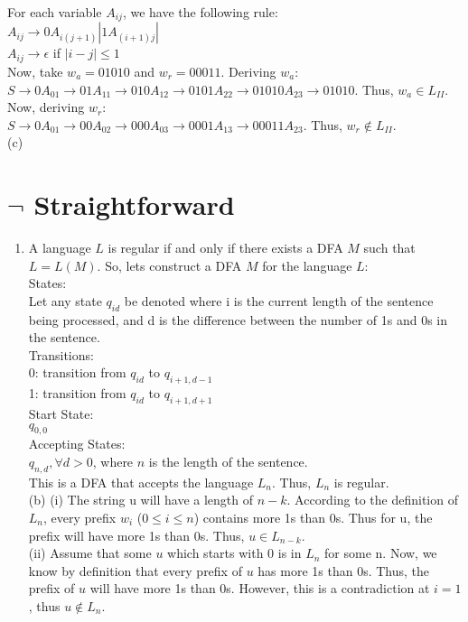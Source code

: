 \documentclass[a4paper]{article}
\begin{document}
\begin{enumerate}
For each variable $A_{ij}$, we have the following rule:\\
$A_{ij} \rightarrow 0A_{i(j+1)} | 1A_{(i+1)j} |$\\
$A_{ij} \rightarrow \epsilon$ if $|i-j| \leq 1$\\

Now, take $w_a = 01010$ and $w_r = 00011$. Deriving $w_a$:\\
$S \rightarrow 0A_{01} \rightarrow 01A_{11} \rightarrow 010A_{12} \rightarrow 0101A_{22} \rightarrow 01010A_{23} \rightarrow 01010$. Thus, $w_a \in L_{II}$.\\

Now, deriving $w_r$:\\
$S \rightarrow 0A_{01} \rightarrow 00A_{02} \rightarrow 000A_{03} \rightarrow 0001A_{13} \rightarrow 00011A_{23}$. Thus, $w_r \notin L_{II}$.\\

(c)
\end{enumerate} 

\section{$\neg$ Straightforward}
\begin{enumerate}
\item A language $L$ is regular if and only if there exists a DFA $M$ such that $L = L(M)$. So, lets construct a DFA $M$ for the language $L$:\\

States:\\
Let any state $q_{id}$ be denoted where i is the current length of the sentence being processed, and d is the difference between the number of 1s and 0s in the sentence.\\

Transitions:\\
0: transition from $q_{id}$ to $q_{i+1,d-1}$\\
1: transition from $q_{id}$ to $q_{i+1,d+1}$\\

Start State:\\
$q_{0,0}$\\

Accepting States:\\
$q_{n,d}, \forall d > 0$, where $n$ is the length of the sentence.\\

This is a DFA that accepts the language $L_n$. Thus, $L_n$ is regular.\\

(b) (i) The string u will have a length of $n-k$. According to the definition of $L_n$, every prefix $w_i$ ($0 \leq i \leq n$) contains more 1s than 0s. Thus for u, the prefix will have more 1s than 0s. Thus, $u \in L_{n-k}$.\\

(ii) Assume that some $u$ which starts with 0 is in $L_n$ for some n. Now, we know by definition that every prefix of $u$ has more 1s than 0s. Thus, the prefix of $u$ will have more 1s than 0s. However, this is a contradiction at $i = 1$, thus $u \notin L_n$.\\


\end{enumerate} 
\end{document}

